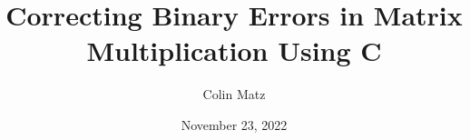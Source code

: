 \documentclass{article}
\begin{document}
    \title{Correcting Binary Errors in Matrix Multiplication Using C}
    \author{Colin Matz}
    \date{November 23, 2022}
    \maketitle
\end{document}
